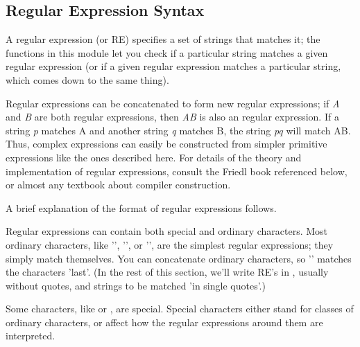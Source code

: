 \subsection{Regular Expression Syntax}

A regular expression (or RE) specifies a set of strings that matches
it; the functions in this module let you check if a particular string
matches a given regular expression (or if a given regular expression
matches a particular string, which comes down to the same thing).

Regular expressions can be concatenated to form new regular
expressions; if \emph{A} and \emph{B} are both regular expressions,
then \emph{AB} is also an regular expression.  If a string \emph{p}
matches A and another string \emph{q} matches B, the string \emph{pq}
will match AB.  Thus, complex expressions can easily be constructed
from simpler primitive expressions like the ones described here.  For
details of the theory and implementation of regular expressions,
consult the Friedl book referenced below, or almost any textbook about
compiler construction.

A brief explanation of the format of regular expressions follows.  

Regular expressions can contain both special and ordinary characters.
Most ordinary characters, like '', '', or '',
are the simplest regular expressions; they simply match themselves.  
You can concatenate ordinary characters, so '' matches the
characters 'last'.  (In the rest of this section, we'll write RE's in
, usually without quotes, and strings to be
matched 'in single quotes'.)

Some characters, like \code{|} or \code{(}, are special.  Special
characters either stand for classes of ordinary characters, or affect
how the regular expressions around them are interpreted.


